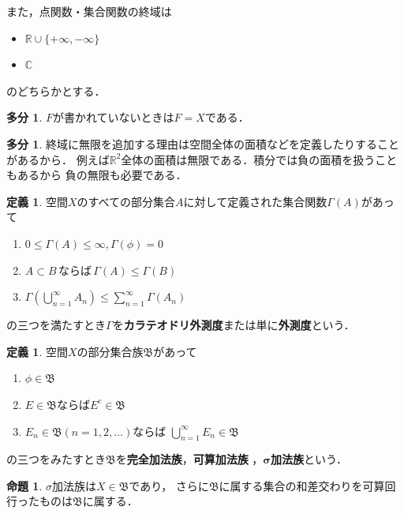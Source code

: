 \documentclass[dvipdfmx,a4paper,12pt]{jsarticle}
\theoremstyle{definition}
\newtheorem{definition}[theorem]{定義}
\newtheorem{proposition}[theorem]{命題}
\newtheorem{tabun}[]{多分}
\begin{document}
また，点関数・集合関数の終域は
\begin{itemize}
    \item $\mathbb{R} \cup \{ +\infty,-\infty\}$
    \item $\mathbb{C}$
\end{itemize}
のどちらかとする．

\begin{tabun}
    $F$が書かれていないときは$F=X$である．
\end{tabun}

\begin{tabun}
    終域に無限を追加する理由は空間全体の面積などを定義したりすることがあるから．
    例えば$\mathbb{R}^2$全体の面積は無限である．積分では負の面積を扱うこともあるから
    負の無限も必要である．
\end{tabun}




\begin{definition}
    空間$X$のすべての部分集合$A$に対して定義された集合関数$\Gamma (A)$があって
    \begin{enumerate}
        \item $0\leq \Gamma (A) \leq \infty , \Gamma (\phi)=0$
        \item $A\subset B\, \text{ならば}\, \Gamma (A) \leq \Gamma (B)$
        \item $\Gamma \left( \displaystyle \bigcup_{n=1}^\infty A_n\right)\leq \displaystyle
        \sum_{n=1}^\infty
        \Gamma (A_n)$
    \end{enumerate}
    の三つを満たすとき$\Gamma$を\textbf{カラテオドリ外測度}または単に\textbf{外測度}という．
\end{definition}

\begin{definition}\label{def:sigmakahouzoku}
空間$X$の部分集合族$\mathfrak{B}$があって
\begin{enumerate}
    \item $\phi \in \mathfrak{B}$
    \item $E\in \mathfrak{B}$ならば$E^c\in \mathfrak{B}$
    \item $E_n\in \mathfrak{B}(n=1,2,\ldots)$ならば
    $\displaystyle\bigcup_{n=1}^{\infty}E_n\in \mathfrak{B}$
\end{enumerate}
の三つをみたすとき$\mathfrak{B}$を\textbf{完全加法族}，\textbf{可算加法族}
，$\mathbf{\sigma}$\textbf{加法族}という．
\end{definition}

\begin{proposition}
    $\sigma$加法族は$X\in \mathfrak{B}$であり，
    さらに$\mathfrak{B}$に属する集合の和差交わりを可算回行ったものは$\mathfrak{B}$に属する．
\end{proposition}
\end{document}
